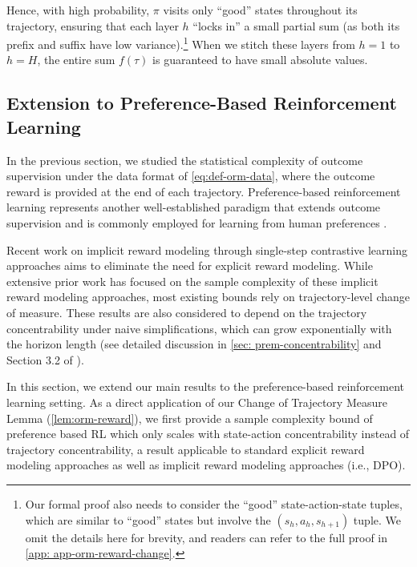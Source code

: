 \documentclass{article}
\begin{document}
Hence, with high probability, $\pi$ visits only ``good'' states throughout its trajectory, ensuring that each layer $h$ ``locks in'' a small partial sum (as both its prefix and suffix have low variance).\footnote{Our formal proof also needs to consider the ``good'' state-action-state tuples, which are similar to ``good'' states but involve the $(s_h,a_h,s_{h+1})$ tuple. We omit the details here for brevity, and readers can refer to the full proof in \cref{app: app-orm-reward-change}.}
When we stitch these layers from $h = 1$ to $h = H$, the entire sum $f(\tau)$ is guaranteed to have small absolute values.









\subsection{Extension to Preference-Based Reinforcement Learning}\label{sec: dpo}

In the previous section, we studied the statistical complexity of outcome supervision under the data format of \cref{eq:def-orm-data}, where the outcome reward is provided at the end of each trajectory. Preference-based reinforcement learning \citep[e.g.,][]{knox2008tamer,akrour2012april,wirth2017survey} represents another well-established paradigm that extends outcome supervision and is commonly employed for learning from human preferences \citep[e.g.,][]{griffith2013policy,christiano2017deep,stiennon2020learning,ouyang2022training}.

Recent work on implicit reward modeling through single-step contrastive learning approaches \citep[DPO;][]{rafailov2023direct} aims to eliminate the need for explicit reward modeling. While extensive prior work \citep[e.g.,][]{zhan2023provable,liu2024provably,song2024importance,zhang2024self} has focused on the sample complexity of these implicit reward modeling approaches, most existing bounds rely on trajectory-level change of measure.
These results are also considered to depend on the trajectory concentrability under naive simplifications, which can grow exponentially with the horizon length (see detailed discussion in \cref{sec: prem-concentrability} and Section 3.2 of \citealt{xie2024exploratory}).

In this section, we extend our main results to the preference-based reinforcement learning setting. As a direct application of our Change of Trajectory Measure Lemma (\cref{lem:orm-reward}), we first provide a sample complexity bound of preference based RL which only scales with state-action concentrability instead of trajectory concentrability, a result applicable to standard explicit reward modeling approaches as well as implicit reward modeling approaches (i.e., DPO).
\end{document}

